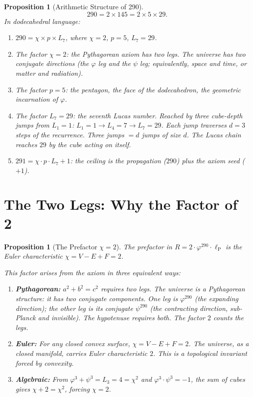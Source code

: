 \documentclass[11pt,a4paper]{article}
\theoremstyle{plain}
\newtheorem{proposition}[theorem]{Proposition}
\theoremstyle{definition}
\newcommand{\lP}{\ell_{\mathrm{P}}}
\newcommand{\vp}{\varphi}
\begin{document}
\begin{proposition}[Arithmetic Structure of 290]\label{prop:factor}
\[
  290 = 2 \times 145 = 2 \times 5 \times 29.
\]
In dodecahedral language:
\begin{enumerate}[nosep]
  \item $290 = \chi \times p \times L_7$, where $\chi = 2$, $p = 5$,
    $L_7 = 29$.
  \item The factor $\chi = 2$: the Pythagorean axiom has two legs.
    The universe has two conjugate directions (the $\vp$ leg and the
    $\psi$ leg; equivalently, space and time, or matter and radiation).
  \item The factor $p = 5$: the pentagon, the face of the dodecahedron,
    the geometric incarnation of $\vp$.
  \item The factor $L_7 = 29$: the seventh Lucas number.  Reached
    by three cube-depth jumps from $L_1 = 1$:
    $L_1 = 1 \to L_4 = 7 \to L_7 = 29$.  Each jump traverses $d = 3$
    steps of the recurrence.  Three jumps $= d$ jumps of size $d$.
    The Lucas chain reaches $29$ by the cube acting on itself.
  \item $291 = \chi \cdot p \cdot L_7 + 1$: the ceiling is the
    propagation ($290$) plus the axiom seed ($+1$).
\end{enumerate}
\end{proposition}

\section{The Two Legs: Why the Factor of 2}\label{sec:two}

\begin{proposition}[The Prefactor $\chi = 2$]\label{prop:chi}
The prefactor in $R = 2 \cdot \vp^{290} \cdot \lP$ is the Euler
characteristic $\chi = V - E + F = 2$.

This factor arises from the axiom in three equivalent ways:
\begin{enumerate}[nosep]
  \item \textbf{Pythagorean:} $a^2 + b^2 = c^2$ requires two legs.
    The universe is a Pythagorean structure: it has two conjugate
    components.  One leg is $\vp^{290}$ (the expanding direction);
    the other leg is its conjugate $\psi^{290}$ (the contracting
    direction, sub-Planck and invisible).  The hypotenuse requires
    both.  The factor $2$ counts the legs.
  \item \textbf{Euler:} For any closed convex surface,
    $\chi = V - E + F = 2$.  The universe, as a closed manifold,
    carries Euler characteristic $2$.  This is a topological invariant
    forced by convexity.
  \item \textbf{Algebraic:} From $\vp^3 + \psi^3 = L_3 = 4 = \chi^2$
    and $\vp^3 \cdot \psi^3 = -1$, the sum of cubes gives
    $\chi + 2 = \chi^2$, forcing $\chi = 2$.
\end{enumerate}
\end{proposition}
\end{document}
